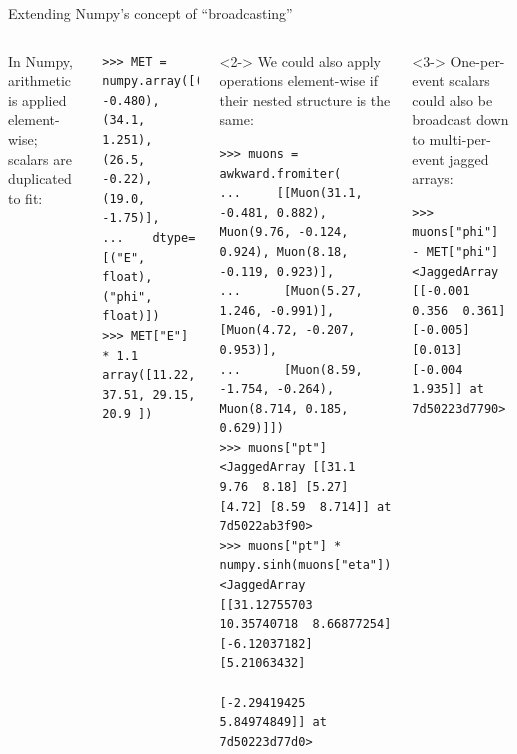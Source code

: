 \documentclass[aspectratio=169]{beamer}
\begin{document}
\begin{frame}[fragile]{Extending Numpy's concept of ``broadcasting''}
\vspace{0.5 cm}
\begin{columns}
\scriptsize
\vspace{0.25 cm}
{\normalsize In Numpy, arithmetic is applied element-wise; scalars are duplicated to fit:}
\begin{verbatim}
>>> MET = numpy.array([(10.2, -0.480), (34.1, 1.251), (26.5, -0.22), (19.0, -1.75)],
...    dtype=[("E", float), ("phi", float)])
>>> MET["E"] * 1.1
array([11.22, 37.51, 29.15, 20.9 ])
\end{verbatim}

\vspace{0.25 cm}
\begin{uncoverenv}<2->
{\normalsize We could also apply operations element-wise if their nested structure is the same:}
\begin{verbatim}
>>> muons = awkward.fromiter(
...     [[Muon(31.1, -0.481, 0.882), Muon(9.76, -0.124, 0.924), Muon(8.18, -0.119, 0.923)],
...      [Muon(5.27, 1.246, -0.991)], [Muon(4.72, -0.207, 0.953)],
...      [Muon(8.59, -1.754, -0.264), Muon(8.714, 0.185, 0.629)]])
>>> muons["pt"]
<JaggedArray [[31.1   9.76  8.18] [5.27] [4.72] [8.59  8.714]] at 7d5022ab3f90>
>>> muons["pt"] * numpy.sinh(muons["eta"])
<JaggedArray [[31.12755703 10.35740718  8.66877254] [-6.12037182] [5.21063432]
              [-2.29419425  5.84974849]] at 7d50223d77d0>
\end{verbatim}
\end{uncoverenv}

\vspace{0.25 cm}
\begin{uncoverenv}<3->
{\normalsize One-per-event scalars could also be broadcast down to multi-per-event jagged arrays:}
\begin{verbatim}
>>> muons["phi"] - MET["phi"]
<JaggedArray [[-0.001  0.356  0.361] [-0.005] [0.013] [-0.004  1.935]] at 7d50223d7790>
\end{verbatim}
\end{uncoverenv}
\end{columns}
\end{frame}
\end{document}
